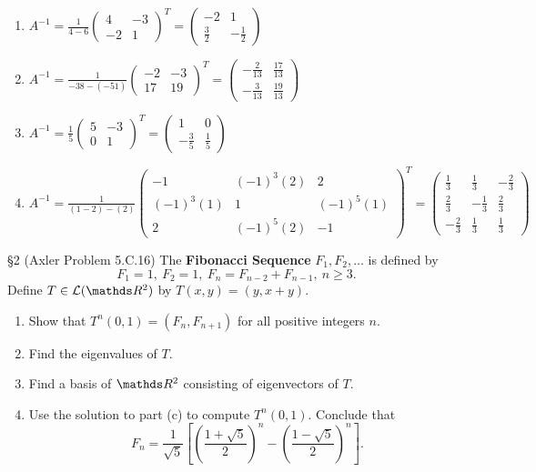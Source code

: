 \documentclass{review-sheet}
\begin{document}
\begin{solution}
  \begin{enumerate}[label=(\alph*)]
    \item $A^{-1}=\frac{1}{4-6}\begin{pmatrix} 4&-3\\-2&1 \end{pmatrix}^T =\begin{pmatrix}
      -2&1\\ \frac{3}{2}&-\frac{1}{2} \end{pmatrix} $
    \item $A^{-1}=\frac{1}{-38-(-51)}\begin{pmatrix} -2&-3\\17&19 \end{pmatrix}^T =\begin{pmatrix}
      -\frac{2}{13}&\frac{17}{13}\\-\frac{3}{13}&\frac{19}{13} \end{pmatrix} $
    \item $A^{-1}=\frac{1}{5}\begin{pmatrix} 5&-3\\0&1 \end{pmatrix}^T =\begin{pmatrix}
      1&0\\-\frac{3}{5}&\frac{1}{5} \end{pmatrix} $
    \item $A^{-1}=\frac{1}{(1-2)-(2)}\begin{pmatrix} -1 & (-1)^3(2) & 2\\ (-1)^3(1)&1&(-1)^5(1)\\
        2&(-1)^5(2)&-1 \end{pmatrix}^T=\begin{pmatrix}
      \frac{1}{3}&\frac{1}{3}&-\frac{2}{3}\\\frac{2}{3}&-\frac{1}{3}
                 &\frac{2}{3}\\-\frac{2}{3}&\frac{1}{3}&\frac{1}{3} \end{pmatrix} $
  \end{enumerate}
\end{solution}

\begin{problem}{\S 2}
  (Axler Problem 5.C.16) The \textbf{Fibonacci Sequence} $F_1,F_2,\ldots$ is defined by \[
    F_1=1,\ F_2=1,\ F_n=F_{n-2}+F_{n-1},\ n\ge 3
  .\] Define $T\in \mc{L}(\R^2)$ by $T(x,y)=(y,x+y)$.
  \begin{enumerate}[label=(\alph*)]
    \item Show that $T^n(0,1)=(F_n,F_{n+1})$ for all positive integers $n$.
    \item Find the eigenvalues of $T$.
    \item Find a basis of $\R^2$ consisting of eigenvectors of $T$.
    \item Use the solution to part (c) to compute $T^n(0,1)$. Conclude that \[
        F_n=\frac{1}{\sqrt{5}}\left[ \left( \frac{1+\sqrt{5}}{2} \right) ^n-\left(
        \frac{1-\sqrt{5}}{2} \right)^n \right] 
    .\] 

  \end{enumerate}
\end{problem}
\end{document}
